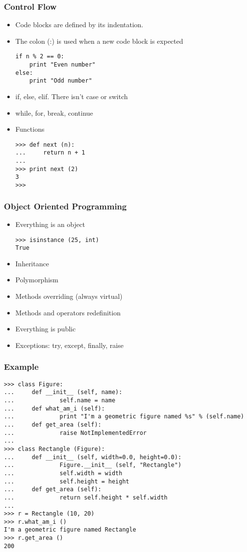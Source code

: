\begin{frame}[fragile]
  \frametitle{Control Flow}
  \begin{itemize}
  \item Code blocks are defined by its indentation.
  \item The colon (:) is used when a new code block is expected
{\scriptsize
\begin{verbatim}
if n % 2 == 0:
    print "Even number"
else:
    print "Odd number"
\end{verbatim}
}
  \item if, else, elif. There isn't case or switch
  \item while, for, break, continue
  \item Functions
{\scriptsize
\begin{verbatim}
>>> def next (n):
...     return n + 1
... 
>>> print next (2)
3
>>>
\end{verbatim}
}
  \end{itemize}
\end{frame}

\begin{frame}[fragile]
  \frametitle{Object Oriented Programming}
  \begin{itemize}
  \item Everything is an object
{\scriptsize
\begin{verbatim}
>>> isinstance (25, int)
True
\end{verbatim}
}

\item Inheritance
\item Polymorphism
\item Methods overriding (always virtual)
\item Methods and operators redefinition
\item Everything is public
\item Exceptions: try, except, finally, raise
\end{itemize}
\end{frame}

\begin{frame}[fragile]
  \frametitle{Example}
{\scriptsize
\begin{verbatim}
>>> class Figure:
...     def __init__ (self, name):
...             self.name = name
...     def what_am_i (self):
...             print "I'm a geometric figure named %s" % (self.name)
...     def get_area (self):
...             raise NotImplementedError
... 
>>> class Rectangle (Figure):
...     def __init__ (self, width=0.0, height=0.0):
...             Figure.__init__ (self, "Rectangle")
...             self.width = width
...             self.height = height
...     def get_area (self):
...             return self.height * self.width
... 
>>> r = Rectangle (10, 20)
>>> r.what_am_i ()
I'm a geometric figure named Rectangle
>>> r.get_area ()
200
\end{verbatim}
}
\end{frame}

